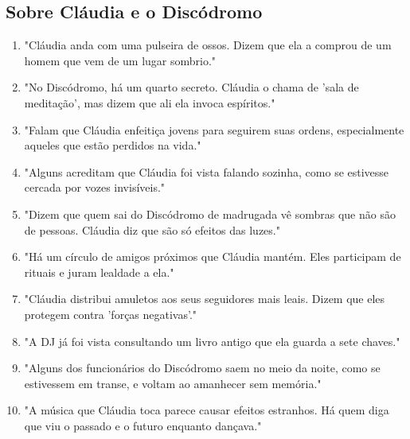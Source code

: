 \subsection*{Sobre Cláudia e o Discódromo}
\begin{enumerate}
    \item "Cláudia anda com uma pulseira de ossos. Dizem que ela a comprou de um homem que vem de um lugar sombrio."
    \item "No Discódromo, há um quarto secreto. Cláudia o chama de 'sala de meditação', mas dizem que ali ela invoca espíritos."
    \item "Falam que Cláudia enfeitiça jovens para seguirem suas ordens, especialmente aqueles que estão perdidos na vida."
    \item "Alguns acreditam que Cláudia foi vista falando sozinha, como se estivesse cercada por vozes invisíveis."
    \item "Dizem que quem sai do Discódromo de madrugada vê sombras que não são de pessoas. Cláudia diz que são só efeitos das luzes."
    \item "Há um círculo de amigos próximos que Cláudia mantém. Eles participam de rituais e juram lealdade a ela."
    \item "Cláudia distribui amuletos aos seus seguidores mais leais. Dizem que eles protegem contra 'forças negativas'."
    \item "A DJ já foi vista consultando um livro antigo que ela guarda a sete chaves."
    \item "Alguns dos funcionários do Discódromo saem no meio da noite, como se estivessem em transe, e voltam ao amanhecer sem memória."
    \item "A música que Cláudia toca parece causar efeitos estranhos. Há quem diga que viu o passado e o futuro enquanto dançava."
\end{enumerate}


